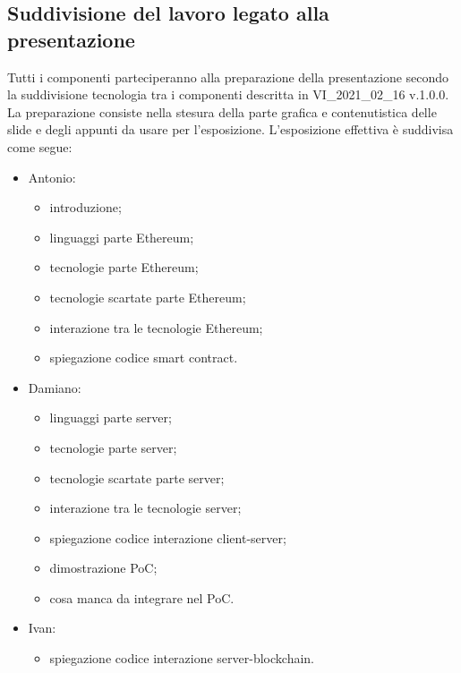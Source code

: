 \subsection*{Suddivisione del lavoro legato alla presentazione}
Tutti i componenti parteciperanno alla preparazione della presentazione secondo la suddivisione tecnologia tra i componenti descritta in VI\_2021\_02\_16 v.1.0.0. La preparazione consiste nella stesura della parte grafica e contenutistica delle slide e degli appunti da usare per l'esposizione. L'esposizione effettiva è suddivisa come segue:
\begin{itemize}
	\item Antonio:
	\begin{itemize}
		\item introduzione;
		\item linguaggi parte Ethereum;
		\item tecnologie parte Ethereum;
		\item tecnologie scartate parte Ethereum;
		\item interazione tra le tecnologie Ethereum;
		\item spiegazione codice smart contract.
	\end{itemize}
	\item Damiano:
	\begin{itemize}
		\item linguaggi parte server;
		\item tecnologie parte server;
		\item tecnologie scartate parte server;
		\item interazione tra le tecnologie server;
		\item spiegazione codice interazione client-server;
		\item dimostrazione PoC;
		\item cosa manca da integrare nel PoC.
	\end{itemize}
	\item Ivan:
	\begin{itemize}
		\item spiegazione codice interazione server-blockchain.
	\end{itemize}
\end{itemize}
